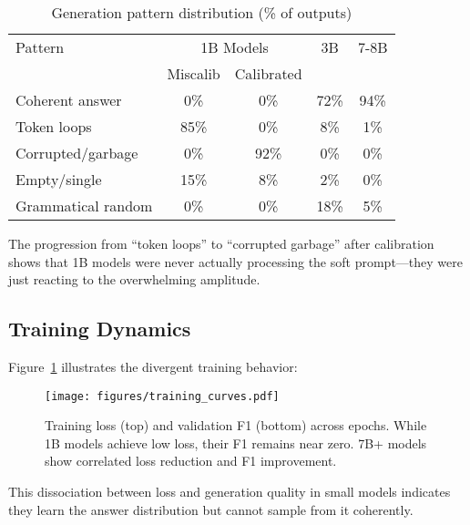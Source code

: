 \documentclass{article}
\begin{document}
\begin{table}[h]
\caption{Generation pattern distribution (\% of outputs)}
\label{tab:generation_patterns_extended}
\vskip 0.15in
\begin{center}
\begin{small}
\begin{tabular}{lcccc}
\toprule
Pattern & \multicolumn{2}{c}{1B Models} & 3B & 7-8B \\
 & Miscalib & Calibrated & & \\
\midrule
Coherent answer & 0\% & 0\% & 72\% & 94\% \\
Token loops & 85\% & 0\% & 8\% & 1\% \\
Corrupted/garbage & 0\% & 92\% & 0\% & 0\% \\
Empty/single & 15\% & 8\% & 2\% & 0\% \\
Grammatical random & 0\% & 0\% & 18\% & 5\% \\
\bottomrule
\end{tabular}
\end{small}
\end{center}
\vskip -0.1in
\end{table}

The progression from ``token loops'' to ``corrupted garbage'' after calibration shows that 1B models were never actually processing the soft prompt—they were just reacting to the overwhelming amplitude.

\subsection{Training Dynamics}

Figure~\ref{fig:training_curves} illustrates the divergent training behavior:

\begin{figure}[h]
\vskip 0.2in
\begin{center}
\centerline{\texttt{[image: figures/training\_curves.pdf]}}
\caption{Training loss (top) and validation F1 (bottom) across epochs. While 1B models achieve low loss, their F1 remains near zero. 7B+ models show correlated loss reduction and F1 improvement.}
\label{fig:training_curves}
\end{center}
\vskip -0.2in
\end{figure}

This dissociation between loss and generation quality in small models indicates they learn the answer distribution but cannot sample from it coherently.
\end{document}
